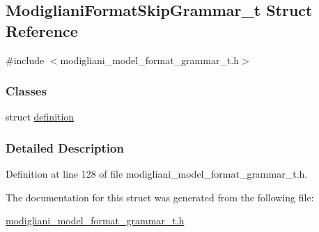 \subsection{ModiglianiFormatSkipGrammar\_\-t Struct Reference}
\label{struct_modigliani_format_skip_grammar__t}


{\ttfamily \#include $<$modigliani\_\-model\_\-format\_\-grammar\_\-t.h$>$}

\subsubsection*{Classes}
\begin{DoxyCompactItemize}
\item 
struct \hyperlink{struct_modigliani_format_skip_grammar__t_1_1definition}{definition}
\end{DoxyCompactItemize}


\subsubsection{Detailed Description}


Definition at line 128 of file modigliani\_\-model\_\-format\_\-grammar\_\-t.h.



The documentation for this struct was generated from the following file:\begin{DoxyCompactItemize}
\item 
\hyperlink{modigliani__model__format__grammar__t_8h}{modigliani\_\-model\_\-format\_\-grammar\_\-t.h}\end{DoxyCompactItemize}
